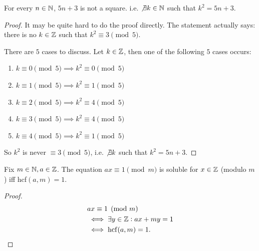 \documentclass[10pt]{scrartcl}
\DeclareMathOperator{\hcf}{hcf}
\begin{document}
\begin{example}
For every $n\in\mathbb{N}$, $5n + 3$ is not a square. i.e. $\not\exists k \in\mathbb{N}$ such that $k^2 = 5n + 3$. 

\begin{proof}
It may be quite hard to do the proof directly. The statement actually says: there is no $k \in\mathbb{Z}$ such that $k^2 \equiv 3 \pmod{5}$. 

There are $5$ cases to discuss. Let $k\in\mathbb{Z}$, then one of the following $5$ cases occurs: 
\begin{enumerate}
\item $k \equiv 0\pmod{5} \implies k^2\equiv 0 \pmod{5}$
\item $k \equiv 1\pmod{5} \implies k^2\equiv 1 \pmod{5}$
\item $k \equiv 2\pmod{5} \implies k^2\equiv 4 \pmod{5}$
\item $k \equiv 3\pmod{5} \implies k^2\equiv 4 \pmod{5}$
\item $k \equiv 4\pmod{5} \implies k^2\equiv 1 \pmod{5}$
\end{enumerate}

So $k^2$ is never $\equiv 3 \pmod{5}$, i.e. $\not\exists k$ such that $k^2  = 5n+3$.
\end{proof}
\end{example}\vspace*{5pt}

\begin{proposition}
Fix $m \in \mathbb{N}, a \in \mathbb{Z}$. The equation $ax \equiv 1 \pmod{m}$ is soluble for $x \in\mathbb{Z}$ (modulo $m$) iff hcf$(a,m) = 1$. 	
\end{proposition}

\begin{proof}
\begin{align*}
  &ax \equiv 1 \pmod{m}\\
  &\iff \exists y \iZ: ax +my = 1\\
  &\iff \hcf(a,m) = 1.\qedhere
\end{align*}
\end{proof}
\end{document}
